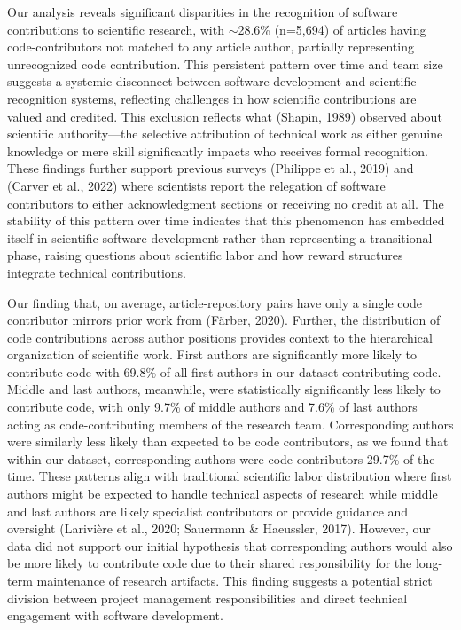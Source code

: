 \documentclass[
  number,
  3p,
  onecolumn]{elsarticle}
\begin{document}
Our analysis reveals significant disparities in the recognition of
software contributions to scientific research, with
$\sim$28.6\% (n=5,694) of articles having code-contributors not
matched to any article author, partially representing unrecognized code
contribution. This persistent pattern over time and team size suggests a
systemic disconnect between software development and scientific
recognition systems, reflecting challenges in how scientific
contributions are valued and credited. This exclusion reflects what
(Shapin, 1989) observed about scientific authority---the selective
attribution of technical work as either genuine knowledge or mere skill
significantly impacts who receives formal recognition. These findings
further support previous surveys (Philippe et al., 2019) and (Carver et
al., 2022) where scientists report the relegation of software
contributors to either acknowledgment sections or receiving no credit at
all. The stability of this pattern over time indicates that this
phenomenon has embedded itself in scientific software development rather
than representing a transitional phase, raising questions about
scientific labor and how reward structures integrate technical
contributions.

Our finding that, on average, article-repository pairs have only a
single code contributor mirrors prior work from (Färber, 2020). Further,
the distribution of code contributions across author positions provides
context to the hierarchical organization of scientific work. First
authors are significantly more likely to contribute code with 69.8\% of
all first authors in our dataset contributing code. Middle and last
authors, meanwhile, were statistically significantly less likely to
contribute code, with only 9.7\% of middle authors and 7.6\% of last
authors acting as code-contributing members of the research team.
Corresponding authors were similarly less likely than expected to be
code contributors, as we found that within our dataset, corresponding
authors were code contributors 29.7\% of the time. These patterns align
with traditional scientific labor distribution where first authors might
be expected to handle technical aspects of research while middle and
last authors are likely specialist contributors or provide guidance and
oversight (Larivière et al., 2020; Sauermann \& Haeussler, 2017).
However, our data did not support our initial hypothesis that
corresponding authors would also be more likely to contribute code due
to their shared responsibility for the long-term maintenance of research
artifacts. This finding suggests a potential strict division between
project management responsibilities and direct technical engagement with
software development.
\end{document}
